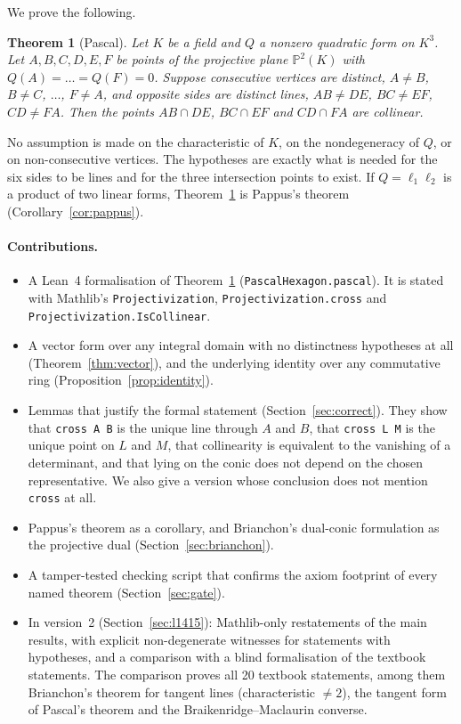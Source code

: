 \documentclass[11pt]{article}
\newtheorem{theorem}{Theorem}
\theoremstyle{remark}
\newcommand{\lean}[1]{\texttt{#1}}
\newcommand{\PP}{\mathbb{P}}
\begin{document}
We prove the following.

\begin{theorem}[Pascal]\label{thm:pascal}
Let $K$ be a field and $Q$ a nonzero quadratic form on $K^3$. Let $A,B,C,D,E,F$ be points of the
projective plane $\PP^2(K)$ with $Q(A)=\dots=Q(F)=0$. Suppose consecutive vertices are distinct,
$A\neq B$, $B\neq C$, $\dots$, $F\neq A$, and opposite sides are distinct lines,
$AB\neq DE$, $BC\neq EF$, $CD\neq FA$. Then the points $AB\cap DE$, $BC\cap EF$ and $CD\cap FA$ are
collinear.
\end{theorem}

No assumption is made on the characteristic of $K$, on the nondegeneracy of $Q$, or on
non-consecutive vertices. The hypotheses are exactly what is needed for the six sides to be lines
and for the three intersection points to exist. If $Q=\ell_1\ell_2$ is a product of two linear forms,
Theorem~\ref{thm:pascal} is Pappus's theorem (Corollary~\ref{cor:pappus}).

\paragraph{Contributions.}
\begin{itemize}
\item A Lean~4 formalisation of Theorem~\ref{thm:pascal} (\lean{PascalHexagon.pascal}). It is
stated with Mathlib's \lean{Projectivization}, \lean{Projectivization.cross} and
\lean{Projectivization.IsCollinear}.
\item A vector form over any integral domain with no distinctness hypotheses at all
(Theorem~\ref{thm:vector}), and the underlying identity over any commutative ring
(Proposition~\ref{prop:identity}).
\item Lemmas that justify the formal statement (Section~\ref{sec:correct}). They show that
\lean{cross A B} is the unique line through $A$ and $B$, that \lean{cross L M} is the unique point
on $L$ and $M$, that collinearity is equivalent to the vanishing of a determinant, and that lying on
the conic does not depend on the chosen representative. We also give a version whose conclusion does
not mention \lean{cross} at all.
\item Pappus's theorem as a corollary, and Brianchon's dual-conic formulation as the projective
dual (Section~\ref{sec:brianchon}).
\item A tamper-tested checking script that confirms the axiom footprint of every named theorem
(Section~\ref{sec:gate}).
\item In version~2 (Section~\ref{sec:l1415}): Mathlib-only restatements of the main results, with
explicit non-degenerate witnesses for statements with hypotheses, and a comparison with a blind formalisation of the textbook
statements. The comparison proves all 20 textbook statements, among them Brianchon's theorem for
tangent lines (characteristic $\ne2$), the tangent form of Pascal's theorem and the
Braikenridge--Maclaurin converse.
\end{itemize}
\end{document}
